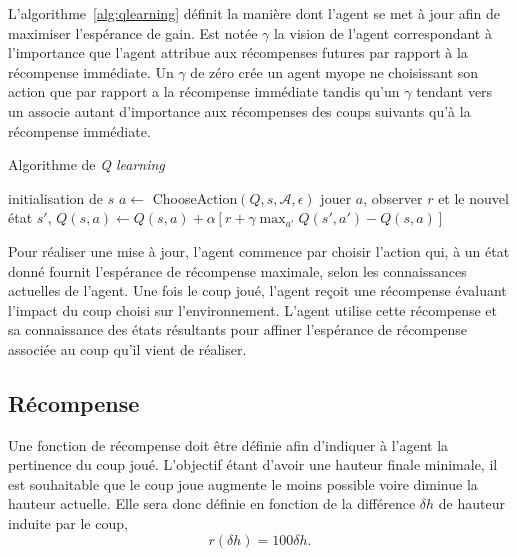 \documentclass{report}
\begin{document}
L'algorithme~\ref{alg:qlearning} définit la manière dont l'agent se met à jour
afin de maximiser l'espérance de gain. Est notée \(\gamma\) la vision de
l'agent correspondant à l'importance que l'agent attribue aux récompenses
futures par rapport à la récompense immédiate. Un \(\gamma\) de zéro crée un
agent myope ne choisissant son action que par rapport a la récompense immédiate
tandis qu'un \(\gamma\) tendant vers un associe autant d'importance aux
récompenses des coups suivants qu'à la récompense immédiate.
\begin{algorithm}
  \caption{Algorithme de \textit{Q learning}}\label{alg:qlearning}
  \begin{algorithmic}
    [1]
    \Repeat{}
    \State{} initialisation de \(s\)
    \Repeat{}
    \State{} \(a \gets\) ChooseAction$(Q, s, \mathcal{A}, \epsilon)$
    \State{} jouer \(a\), observer \(r\) et le nouvel \'etat \(s'\),
    \State{} \(Q(s, a) \gets Q(s, a) + \alpha\left[ r + \gamma \max_{a'}
      Q(s', a') - Q(s, a)\right]\)
    \EndProcedure{}
  \end{algorithmic}
\end{algorithm}

Pour réaliser une mise à jour, l'agent commence par choisir l'action qui, à un
état donné fournit l'espérance de récompense maximale, selon les connaissances
actuelles de l'agent. Une fois le coup joué, l'agent reçoit une récompense
évaluant l'impact du coup choisi sur l'environnement. L'agent utilise
cette récompense et sa connaissance des états résultants pour affiner
l'espérance de récompense associée au coup qu'il vient de réaliser.

\subsection{Récompense}
Une fonction de récompense doit être définie afin d'indiquer à l'agent la
pertinence du coup joué. L'objectif étant d'avoir une hauteur finale minimale,
il est souhaitable que le coup joue augmente le moins possible voire diminue la
hauteur actuelle. Elle sera donc définie en fonction de la différence \(\delta
h\) de hauteur induite par le coup,
\[
  r(\delta h) = 100\delta h.
\]
\end{document}
